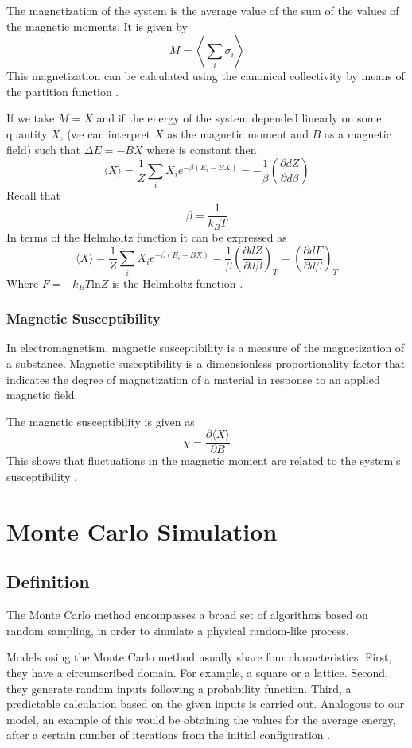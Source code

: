 \documentclass[
    10pt,
    journal,
    compsoc,
    english
]{IEEEtran}
\begin{document}
The magnetization of the system is the average value of the sum of the values of the magnetic moments. It is given by 
\[M = \left \langle \sum_i \sigma_i \right \rangle\]
This magnetization can be calculated using the canonical collectivity by means of the partition function \cite{Magnetizationav}. 

If we take $M = X$ and if the energy of the system depended linearly on some quantity $X$, (we can interpret $X$ as the magnetic moment and $B$ as a magnetic field) such that $\Delta E = - BX$ where is constant then
\[\langle X \rangle =  \dfrac{1}{Z}\sum_i X_ie^{-\beta (E_i -BX)} = - \dfrac{1}{\beta} \left(\dfrac{\partial{d}Z}{\partial{d}\beta}\right)
\]
Recall that 
\[ \beta = \dfrac{1}{k_BT}\]
In terms of the Helmholtz function it can be expressed as
\[\langle X \rangle =  \dfrac{1}{Z}\sum_i X_ie^{-\beta (E_i -BX)} = \dfrac{1}{\beta} \left(\dfrac{\partial{d}Z}{\partial{d}\beta}\right)_T = \left(\dfrac{\partial{d}F}{\partial{d}\beta}\right)_T
\]
Where $F = -k_BT\text{ln}Z$ is the Helmholtz function \cite{Blundell}. 


\subsubsection{Magnetic Susceptibility}
In electromagnetism, magnetic susceptibility is a measure of the magnetization of a substance. Magnetic susceptibility is a dimensionless proportionality factor that indicates the degree of magnetization of a material in response to an applied magnetic field. \cite{SusceptiMag}

The magnetic susceptibility is given as
\[\chi = \dfrac{\partial \langle X \rangle}{\partial B} \]
This shows that fluctuations in the magnetic moment are related to the system's susceptibility \cite{Blundell}.

\section{Monte Carlo Simulation}
\subsection{Definition}
The Monte Carlo method encompasses a broad set of algorithms based on  random sampling, in order to simulate a physical random-like process.

Models using the Monte Carlo method usually share four characteristics. First, they have a circumscribed domain. For example, a square or a lattice. Second, they generate random inputs following a probability function. Third, a predictable calculation based on the given inputs is carried out. Analogous to our model, an example of this would be obtaining the values for the average energy, after a certain number of iterations from the initial configuration \cite{Hammersley_Handscomb_1992} \cite{WikipediaMCM}.
\end{document}

